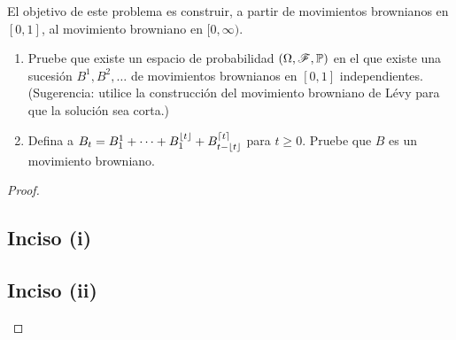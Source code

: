\begin{problema}
	El objetivo de este problema es construir, a partir de movimientos brownianos en $[0,1]$, al movimiento browniano en $[0,\infty)$.
	\begin{enumerate}
		\item 
			Pruebe que existe un espacio de probabilidad $ \left(  \Omega ,\mathscr{F} , \mathbb{P}  \right)  $ en el que existe 
			una sucesi\'on $B^1,B^2,\ldots$ de movimientos brownianos en $[0,1]$ 
			independientes. (Sugerencia: utilice la construcci\'on del movimiento 
			browniano de L\'evy  para que la soluci\'on sea corta.)
			
		\item 
			Defina a $B_t=B^1_1+\cdots+B^{\lfloor t\rfloor}_1+B^{\lceil t \rceil}_{t-\lfloor t\rfloor}$ 
			para $t\geq 0$. Pruebe que $B$ es un movimiento browniano. 
		
	\end{enumerate}
\end{problema}

\begin{proof}
    \subsection{Inciso (i)} \label{problema6_2:inciso1}
    
    \newpage

    \subsection{Inciso (ii)} \label{problema6_2:inciso2}
     
\end{proof}